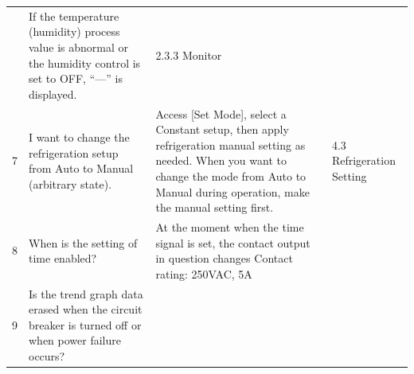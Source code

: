 \begin{longtable}[]{@{}llll@{}}
\begin{minipage}[t]{0.30\columnwidth}
\end{minipage} & \begin{minipage}[t]{0.33\columnwidth}\raggedright
If the temperature (humidity) process value is abnormal or the humidity
control is set to OFF, ``---'' is displayed.\strut
\end{minipage} & \begin{minipage}[t]{0.17\columnwidth}\raggedright
2.3.3 Monitor\strut
\end{minipage}\tabularnewline
\begin{minipage}[t]{0.08\columnwidth}\raggedright
7\strut
\end{minipage} & \begin{minipage}[t]{0.30\columnwidth}\raggedright
I want to change the refrigeration setup from Auto to Manual (arbitrary
state).\strut
\end{minipage} & \begin{minipage}[t]{0.33\columnwidth}\raggedright
Access {[}Set Mode{]}, select a Constant setup, then apply refrigeration
manual setting as needed. When you want to change the mode from Auto to
Manual during operation, make the manual setting first.\strut
\end{minipage} & \begin{minipage}[t]{0.17\columnwidth}\raggedright
4.3 Refrigeration Setting\strut
\end{minipage}\tabularnewline
\begin{minipage}[t]{0.08\columnwidth}\raggedright
8\strut
\end{minipage} & \begin{minipage}[t]{0.30\columnwidth}\raggedright
When is the setting of time enabled?\strut
\end{minipage} & \begin{minipage}[t]{0.33\columnwidth}\raggedright
At the moment when the time signal is set, the contact output in
question changes Contact rating: 250VAC, 5A\strut
\end{minipage} & \begin{minipage}[t]{0.17\columnwidth}\raggedright
\strut
\end{minipage}\tabularnewline
\begin{minipage}[t]{0.08\columnwidth}\raggedright
9\strut
\end{minipage} & \begin{minipage}[t]{0.30\columnwidth}\raggedright
Is the trend graph data erased when the circuit breaker is turned off or
when power failure occurs?\strut
\end{minipage} & \begin{minipage}[t]{0.33\columnwidth}\raggedright

\end{minipage}
\end{longtable}
